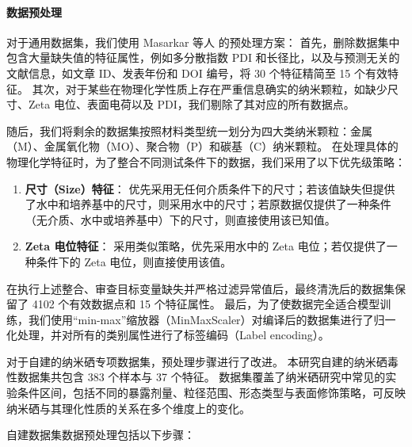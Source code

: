 \documentclass[letterpaper]{article}
\begin{document}
\paragraph{数据预处理}
对于通用数据集，我们使用 Masarkar 等人 \cite{masarkar2024} 的预处理方案：
首先，删除数据集中包含大量缺失值的特征属性，例如多分散指数 PDI 和长径比，以及与预测无关的文献信息，如文章 ID、发表年份和 DOI 编号，将 30 个特征精简至 15 个有效特征。
其次，对于某些在物理化学性质上存在严重信息确实的纳米颗粒，如缺少尺寸、Zeta 电位、表面电荷以及 PDI，我们剔除了其对应的所有数据点。

随后，我们将剩余的数据集按照材料类型统一划分为四大类纳米颗粒：金属（M）、金属氧化物（MO）、聚合物（P）和碳基（C）纳米颗粒。
在处理具体的物理化学特征时，为了整合不同测试条件下的数据，我们采用了以下优先级策略：

\begin{enumerate}
  \item \textbf{尺寸（Size）特征}：
优先采用无任何介质条件下的尺寸；若该值缺失但提供了水中和培养基中的尺寸，则采用水中的尺寸；若原数据仅提供了一种条件（无介质、水中或培养基中）下的尺寸，则直接使用该已知值。

  \item \textbf{Zeta 电位特征}：
采用类似策略，优先采用水中的 Zeta 电位；若仅提供了一种条件下的 Zeta 电位，则直接使用该值。
\end{enumerate}

在执行上述整合、审查目标变量缺失并严格过滤异常值后，最终清洗后的数据集保留了 4102 个有效数据点和 15 个特征属性。
最后，为了使数据完全适合模型训练，我们使用“min-max”缩放器（MinMaxScaler）对编译后的数据集进行了归一化处理，并对所有的类别属性进行了标签编码（Label encoding）。

对于自建的纳米硒专项数据集，预处理步骤进行了改进。
本研究自建的纳米硒毒性数据集共包含 383 个样本与 37 个特征。
数据集覆盖了纳米硒研究中常见的实验条件区间，包括不同的暴露剂量、粒径范围、形态类型与表面修饰策略，可反映纳米硒与其理化性质的关系在多个维度上的变化。

自建数据集数据预处理包括以下步骤：
\end{document}
